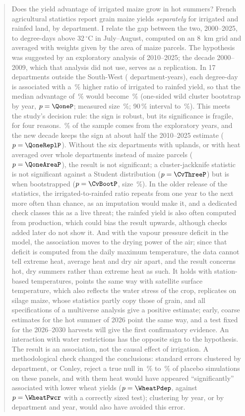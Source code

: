 \begin{abstract}
\noindent Does the yield advantage of irrigated maize grow in hot summers? French agricultural statistics report grain maize yields \emph{separately} for irrigated and rainfed land, by department. I relate the gap between the two, 2000--2025, to degree-days above 32\,$^{\circ}$C in July--August, computed on an 8~km grid and averaged with weights given by the area of maize parcels. The hypothesis was suggested by an exploratory analysis of 2010--2025; the decade 2000--2009, which that analysis did not use, serves as a replication. In 17 departments outside the South-West (\QoneN{} department-years), each degree-day is associated with a \QonePct\,\% higher ratio of irrigated to rainfed yield, so that the median advantage of \GapMedianPct\,\% would become \GapMedianAfterPct\,\% (one-sided wild cluster bootstrap by year, $p = \QoneP$; measured size \QoneSizeWCR\,\%; 90\,\% interval \CiNinetyLow{} to \CiNinetyHigh\,\%). This meets the study's decision rule: the sign is robust, but its significance is fragile, for four reasons. \ExploSharePct\,\% of the sample comes from the exploratory years, and the new decade keeps the sign at about half the 2010--2025 estimate ($p = \QoneReplP$). Without the six departments with uplands, or with heat averaged over whole departments instead of maize parcels ($p = \QoneAreaP$), the result is not significant; a cluster-jackknife statistic is not significant against a Student distribution ($p = \CvThreeP$) but is when bootstrapped ($p = \CvBootP$, size \CvBootSize\,\%). In the older release of the statistics, the irrigated-to-rainfed ratio repeats from one year to the next more often than chance, as an imputation would make it, and a dedicated check classes this as a live threat; the rainfed yield is also often computed from production, which could bias the result upwards, although checks added later do not show it. And with the vapour pressure deficit in the model, the association moves to the drying power of the air; since that deficit is computed from the daily maximum temperature, the data cannot tell extreme heat, average heat and dry air apart, and the result concerns hot, dry summers rather than extreme heat as such. It holds with station-based temperatures, points the same way with satellite surface temperature, which also reflects the water stress of the crop, replicates on silage maize, whose statistics partly copy those of grain, and all \MultiN{} specifications of a multiverse analysis give a positive estimate; early, coarse estimates for the hot summer of 2026 point the same way, and a test fixed for the 2026--2030 harvests will give the first confirmatory evidence. An interaction with water restrictions has the opposite sign to the hypothesis. The result is an association, not the causal effect of irrigation. A methodological check changed the conclusions: standard errors clustered by department, or Conley, reject a true null in \UsualSizeMin\,\% to \UsualSizeMax\,\% of placebo simulations on these panels, and with them heat would have appeared ``significantly'' associated with lower wheat yields ($p = \WheatPdep$, against $p = \WheatPwcr$ with a correctly sized test); clustering by year, or by department and year, would also have avoided this error. 
\end{abstract}
